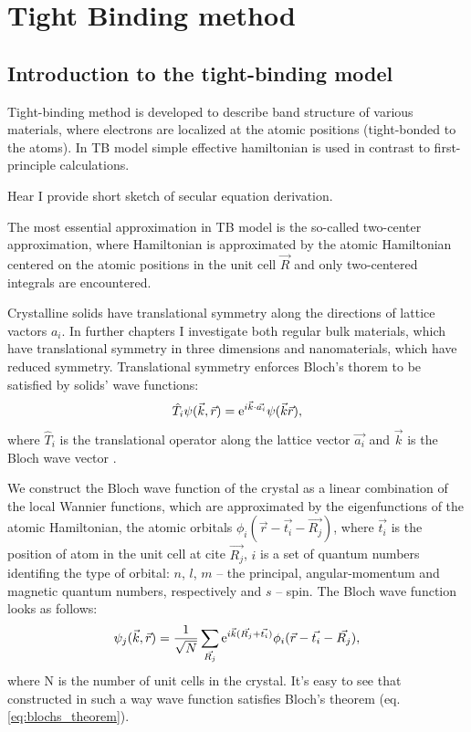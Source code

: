 \chapter{Tight Binding method}
\label{ch:theory}
\section{Introduction to the tight-binding model} \label{sec:TB_theory}
Tight-binding method is developed to describe band structure of various materials, where electrons are localized at the atomic positions (tight-bonded to the atoms). In TB model simple effective hamiltonian is used in contrast to first-principle calculations. 

Hear I provide short sketch of secular equation derivation.

The most essential approximation in TB model is the so-called two-center approximation, where Hamiltonian is approximated by the atomic Hamiltonian centered on the atomic positions in the unit cell $\vec{R}$ and only two-centered integrals are encountered.

Crystalline solids have translational symmetry along the directions of lattice vactors $a_i$. In further chapters I investigate both regular bulk materials, which have translational symmetry in three dimensions and nanomaterials, which have reduced symmetry. Translational symmetry enforces Bloch's thorem to be satisfied by solids' wave functions:
\begin{equation} \label{eq:blochs_theorem}
	\hat{T}_i \psi(\vec{k},\vec{r}) = \mathrm{e}^{i \vec{k} \cdot \vec{a_i}} \psi(\vec{k}\vec{r}),
\end{equation}
where $\hat{T}_i$ is the translational operator along the lattice vector $\vec{a_i}$ and $\vec{k}$ is the Bloch wave vector \cite{kittel}.

We construct the Bloch wave function of the crystal as a linear combination of the local Wannier functions, which are approximated by the eigenfunctions of the atomic Hamiltonian, the atomic orbitals $\phi_{i}(\vec{r} - \vec{t_i} - \vec{R_j})$, where $\vec{t_i}$ is the position of atom in the unit cell at cite $\vec{R_j}$, $i$ is a set of quantum numbers identifing the type of orbital: $n$, $l$, $m$ -- the principal, angular-momentum and magnetic quantum numbers, respectively and $s$ -- spin. The Bloch wave function looks as follows:
\begin{equation} \label{eq:wave_fun}
	\psi_{j}(\vec{k},\vec{r}) = \frac{1}{\sqrt{N}} \sum_{\vec{R_j}} \mathrm{e}^{i\vec{k}(\vec{R_j} + \vec{t_i})} \phi_{i} (\vec{r} - \vec{t_i} - \vec{R_j}),
\end{equation}
where N is the number of unit cells in the crystal. It's easy to see that constructed in such a way wave function satisfies Bloch's theorem (eq. \ref{eq:blochs_theorem}).


